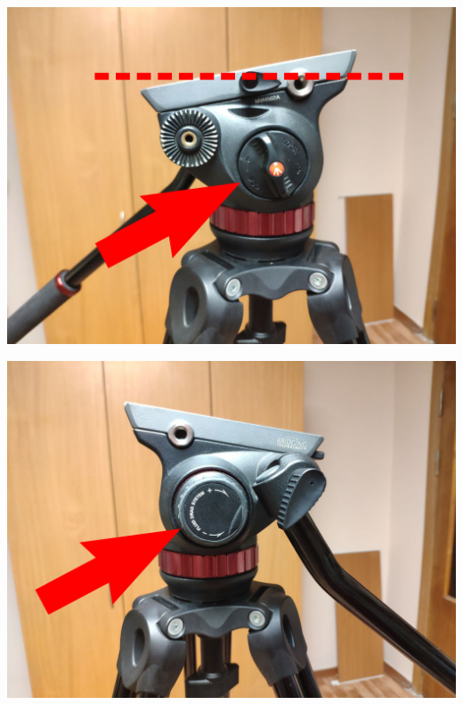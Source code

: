 \begin{enumerate}
\begin{enumerate}
                \begin{minipage}[c]{0.29\textwidth}
                  \centering
                  \includegraphics[width=\textwidth]{Images/PortableCamera/tripod/step2.5-1-lock.jpg}
                \end{minipage}
                \hfill
                \begin{minipage}[c]{0.29\textwidth}
                  \centering
                  \includegraphics[width=\textwidth]{Images/PortableCamera/tripod/step2.5-2-vertical-circle.jpg}
                \end{minipage}
                \hfill
                \begin{minipage}[c]{0.29\textwidth}

\end{minipage}
\end{enumerate}
\end{enumerate}
